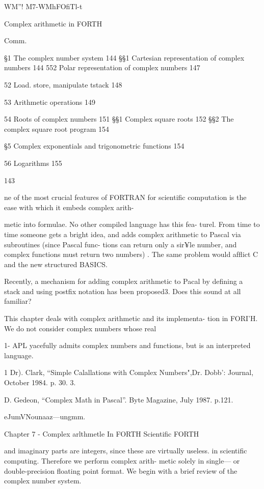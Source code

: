 WM”! M7-WMhFOﬁTl-t

Complex arithmetic in FORTH

Comm.

§1 The complex number system 144
§§1 Cartesian representation of complex numbers 144
552 Polar representation of complex numbers 147

52 Load. store, manipulate tstack 148

53 Arithmetic operations 149

54 Roots of complex numbers 151
§§1 Complex square roots 152
§§2 The complex square root program 154

§5 Complex exponentials and trigonometric functions 154

56 Logarithms 155

143

ne of the most crucial features of FORTRAN for scientiﬁc
computation is the ease with which it embeds complex arith-

metic into formulae. No other compiled language has this fea-
turel. From time to time someone gets a bright idea, and adds
complex arithmetic to Pascal via subroutines (since Pascal func-
tions can return only a sir¥le number, and complex functions
must return two numbers) . The same problem would afﬂict C
and the new structured BASICS.

Recently, a mechanism for adding complex arithmetic to Pacal
by deﬁning a stack and using postfix notation has been proposed3.
Does this sound at all familiar?

This chapter deals with complex arithmetic and its implementa-
tion in FORI'H. We do not consider complex numbers whose real

 

1- APL yacefully admits complex numbers and functions, but is an interpreted language.

1 Dr). Clark, “Simple Calallations with Complex Numbers",Dr. Dobb': Journal, October 1984. p. 30.
3.

D. Gedeon, “Complex Math in Pascal”. Byte Magazine, July 1987. p.121.

eJumVNounaaz—ungmm.

Chapter 7 - Complex arlthmetle In FORTH Scientiﬁc FORTH

and imaginary parts are integers, since these are virtually useless.
in scientiﬁc computing. Therefore we perform complex arith-
metic solely in single— or double-precision ﬂoating point format.
We begin with a brief review of the complex number system.

